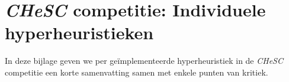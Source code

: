 \chapter{\emph{CHeSC} competitie: Individuele hyperheuristieken}


In deze bijlage geven we per ge\"implementeerde hyperheuristiek in de \emph{CHeSC} competitie een korte samenvatting samen met enkele punten van kritiek.































